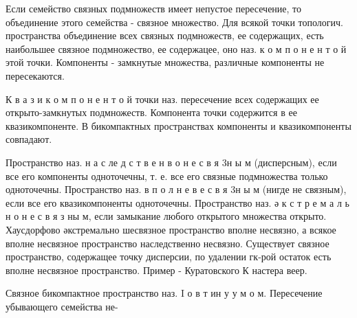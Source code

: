 \documentclass[10pt]{article}
\begin{document}
Если семейство связных подмножеств имеет непустое пересечение, то объединение этого семейства - связное множество. Для всякой точки топологич. пространства объединение всех связных подмножеств, ее содержащих, есть наибольшее связное подмножество, ее содержацее, оно наз. к о м п о н е н т о й этой точки. Компоненты - замкнутые множества, различные компоненты не пересекаются.



К в а з и к о м п о н е н т о й точки наз. пересечение всех содержащих ее открыто-замкнутых подмножеств. Компонента точки содержится в ее квазикомпоненте. В бикомпактных пространствах компоненты и квазикомпоненты совпадают.



Пространство наз. н а с ле д с т в е н в о н е с в я 3н ы м (дисперсным), если все его компоненты одноточечны, т. е. все его связные подмножества только одноточечны. Пространство наз. в п о л н е в е с в я 3н ы м (нигде не связным), если все его квазикомпоненты одноточечны. Пространство наз. ә к с т р е м а л ь н о н е с в я з ны м, если замыкание любого открытого множества открыто. Хаусдорфово әкстремально шесвязное пространство вполне несвязно, а всякое вполне несвязное пространство наследственно несвязно. Существует связное пространство, содержащее точку дисперсии, по удалении гк-рой остаток есть вполне несвязное пространство. Пример - Куратовского К настера веер.



Связное бикомпактное пространство наз. I о в т ин у у м о м. Пересечение убывающего семейства не-
\end{document}
